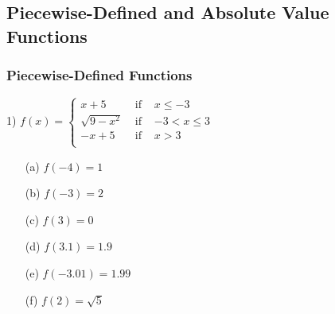 \documentclass[11pt]{book}
\theoremstyle{definition}  %
\newcounter{HW}
\newcounter{HWindent}
\newcommand{\pp}{\par~\par}
\begin{document}
\newpage
\subsection*{Piecewise-Defined and Absolute Value Functions}

\subsubsection{Piecewise-Defined Functions}



1) \scriptsize
$f(x) = \left\{  \begin{array}{rcr} x + 5 & \mbox{ if } & x \leq -3 \\ \sqrt{9-x^2} & \mbox{ if } & -3 < x \leq 3 \\ -x+5 & \mbox{ if } & x > 3 \\ \end{array} \right.$
\normalsize

\begin{multicols}{3}
\begin{enumerate}

\item[(a)] $f(-4)=1$
\item[(b)]  $f(-3)=2$
\item[(c)]  $f(3)=0$

\setcounter{HWindent}{\value{enumii}}
\end{enumerate}
\end{multicols}

\begin{multicols}{3}
\begin{enumerate}
\setcounter{enumii}{\value{HWindent}}

\item[(d)]  $f(3.1)=1.9$
\item[(e)]  $f(-3.01)=1.99$
\item[(f)]  $f(2)=\sqrt{5}$

\setcounter{HWindent}{\value{enumii}}
\end{enumerate}
\end{multicols}
\end{document}
